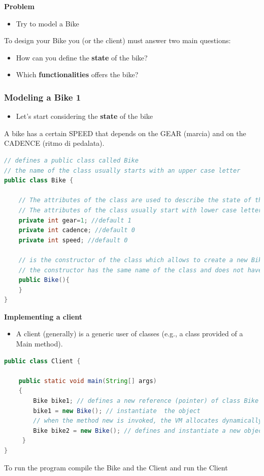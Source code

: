 \documentclass{article}
\theoremstyle{definition}
\begin{document}
\textbf{Problem}
\begin{itemize}
\item Try to model a Bike
\end{itemize}

To design your Bike you (or the client) must answer two main questions:
\begin{itemize}
\item How can you define the \textbf{state} of the bike?
\item Which \textbf{functionalities} offers the bike?
\end{itemize}


\subsubsection{Modeling a Bike 1}
\begin{itemize}
\item Let's start considering the \textbf{state} of the bike
\end{itemize}
A bike has a certain SPEED that depends on the GEAR (marcia) and on the CADENCE (ritmo di pedalata).

\begin{lstlisting}[language=Java,escapechar=|]
// defines a public class called Bike 
// the name of the class usually starts with an upper case letter
public class Bike {
	
	// The attributes of the class are used to describe the state of the class and are usually private or protected 
	// The attributes of the class usually start with lower case letters
	private int gear=1; //default 1
	private int cadence; //default 0
	private int speed; //default 0
	
	// is the constructor of the class which allows to create a new Bike
	// the constructor has the same name of the class and does not have a return type
	public Bike(){
	}
}
\end{lstlisting}

\textbf{Implementing a client}
\begin{itemize}
\item A client (generally) is a generic user of classes (e.g., a class provided of a Main method).
\end{itemize}

\begin{lstlisting}[language=Java,escapechar=|]
public class Client {
	
	public static void main(String[] args)
    {
        Bike bike1; // defines a new reference (pointer) of class Bike with a predefined value null
        bike1 = new Bike(); // instantiate  the object
        // when the method new is invoked, the VM allocates dynamically the quantity of memory which is sufficient to contain the Bike object
        Bike bike2 = new Bike(); // defines and instantiate a new object of class Bike
     }
}
\end{lstlisting}
To run the program compile the Bike and the Client and run the Client
\end{document}
